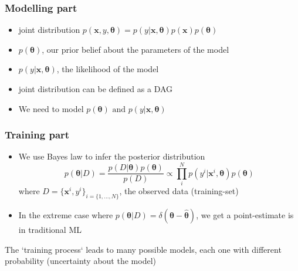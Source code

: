 \documentclass{beamer}
\newcommand{\thetab}{\boldsymbol{\theta}}
\newcommand{\xb}{\boldsymbol{x}}
\begin{document}
\begin{frame}
  \frametitle{Modelling part}
  \begin{itemize}
    \item joint distribution \( p(\xb, y, \thetab) = p(y|\xb,\thetab) p(\xb) p(\thetab) \)
    \item \( p(\thetab) \), our prior belief about the parameters of the model
    \item \( p(y|\xb, \thetab)\), the likelihood of the model
    \item joint distribution can be defined as a \alert{DAG}
  \end{itemize}

  \begin{figure}[!h]
\end{figure}

\noindent\makebox[\linewidth]{\rule{\paperwidth}{0.4pt}}
\begin{itemize}
\item We need to model \alert{ \(p(\thetab) \text{ and } p(y|\xb, \thetab) \)}
\end{itemize}

\end{frame}


\begin{frame}
  \frametitle{Training part}
  \begin{itemize}
  \item We use Bayes law to infer the posterior distribution
    \begin{equation}
      p(\thetab|D) = \frac{p(D|\thetab)p(\thetab)}{p(D)} \propto \prod_i^N p(y^i|\xb^i, \thetab)p(\thetab)
    \end{equation}
    where $D = \{\xb^i, y^i\}_{i=\{1, ..., N\}}$, the observed data (training-set)
    \item In the extreme case where $p(\thetab|D) = \delta(\thetab - \hat{\thetab})$, we get a point-estimate is in traditional ML
    \end{itemize}

    \noindent\makebox[\linewidth]{\rule{\paperwidth}{0.4pt}}
    The `training process` leads to many possible models, each one with different probability (\alert{uncertainty about the model})

\end{frame}
\end{document}
